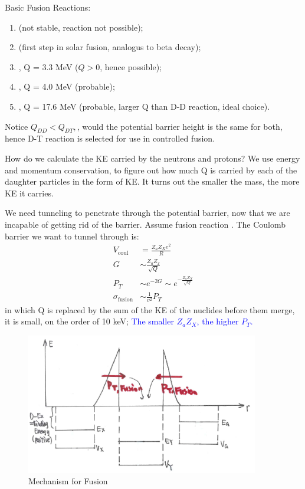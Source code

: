 \documentclass{school-22.101-notes}
\begin{document}
Basic Fusion Reactions: 
\begin{enumerate}
\item {} (not stable, reaction not possible); 
\item {} (first step in solar fusion, analogus to beta decay);
\item {}, Q = 3.3 MeV ($Q>0$, hence possible); 
\item {}, Q = 4.0 MeV (probable);
\item {}, Q = 17.6 MeV (probable, larger Q than D-D reaction, ideal choice).
\end{enumerate}
Notice $Q_{DD} < Q_{DT},$, would the potential barrier height is the same for both, hence D-T reaction is selected for use in controlled fusion. 

How do we calculate the KE carried by the neutrons and protons? We use energy and momentum conservation, to figure out how much Q is carried by each of the daughter particles in the form of KE. It turns out the smaller the mass, the more KE it carries. 

We need tunneling to penetrate through the potential barrier, now that we are incapable of getting rid of the barrier. Assume fusion reaction . The Coulomb barrier we want to tunnel through is: 
\begin{align}
V_{\mathrm{coul}} &= \frac{Z_{a} Z_{X} e^2 }{R} \\
G &\sim \frac{Z_a Z_x}{\sqrt{Q}} \\
P_T &\sim e^{-2G} \sim e^{- \frac{Z_a Z_X}{\sqrt{Q}}} \\
\sigma_{\mathrm{fusion}} &\sim \frac{1}{v^2} P_T
\end{align}
in which Q is replaced by the sum of the KE of the nuclides before them merge, it is small, on the order of 10 keV; \textcolor{blue}{The smaller $Z_a Z_X$, the higher $P_T$.} 
\begin{figure}
   \centering
   \includegraphics[width=4in]{images/ni/fusion-mechanism.png}
   \caption{Mechanism for Fusion\label{fusion-mechanism}}
\end{figure}
\end{document}
